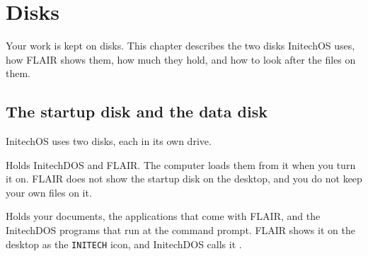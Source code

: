 \chapter{Disks}
\label{ch:disks}

Your work is kept on disks.  This chapter describes the two disks
InitechOS uses, how FLAIR shows them, how much they hold, and how to look
after the files on them.

\section{The startup disk and the data disk}
InitechOS uses two disks, each in its own drive.

Holds InitechDOS and FLAIR.  The computer loads
them from it when you turn it on.  FLAIR does not show the startup disk on
the desktop, and you do not keep your own files on it.

Holds your documents, the applications that come with
FLAIR, and the InitechDOS programs that run at the command prompt.  FLAIR
shows it on the desktop as the \texttt{INITECH} icon, and InitechDOS calls
it .


